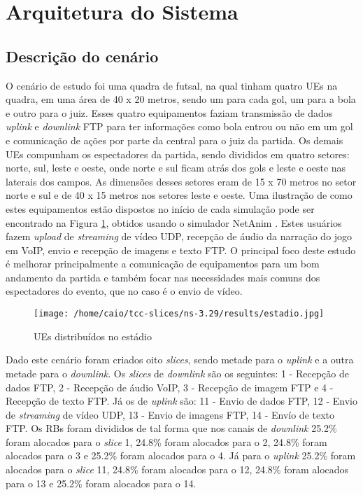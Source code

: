 \documentclass[11pt,twoside]{article}
\begin{document}
\section{Arquitetura do Sistema}

\subsection{Descrição do cenário}

	O cenário de estudo foi uma quadra de futsal, na qual tinham quatro UEs na quadra, em uma área de 40 x 20 metros, sendo um para cada gol, um para a bola e outro para o juiz. Esses quatro equipamentos faziam transmissão de dados \textit{uplink} e \textit{downlink} FTP para ter informações como bola entrou ou não em um gol e comunicação de ações por parte da central para o juiz da partida. Os demais UEs compunham os espectadores da partida, sendo divididos em quatro setores: norte, sul, leste e oeste, onde norte e sul ficam atrás dos gols e leste e oeste nas laterais dos campos. As dimensões desses setores eram de 15 x 70 metros no setor norte e sul e de 40 x 15 metros nos setores leste e oeste. Uma ilustração de como estes equipamentos estão dispostos no início de cada simulação pode ser encontrado na Figura \ref{estadio}, obtidos usando o simulador NetAnim \cite{netAnim}. Estes usuários fazem \textit{upload} de \textit{streaming} de vídeo UDP, recepção de áudio da narração do jogo em VoIP, envio e recepção de imagens e texto FTP. O principal foco deste estudo é melhorar principalmente a comunicação de equipamentos para um bom andamento da partida e também focar nas necessidades mais comuns dos espectadores do evento, que no caso é o envio de vídeo.
	
	\begin{figure}[H]
		\centering
		\texttt{[image: /home/caio/tcc-slices/ns-3.29/results/estadio.jpg]}
		\caption{UEs distribuídos no estádio}
		\label{estadio}
	\end{figure}
	
	Dado este cenário foram criados oito \textit{slices}, sendo metade para o \textit{uplink} e a outra metade para o \textit{downlink}. Os \textit{slices} de  \textit{downlink} são os seguintes: 1 - Recepção de dados FTP, 2 - Recepção de áudio VoIP, 3 - Recepção de imagem FTP e 4 - Recepção de texto FTP. Já os de \textit{uplink} são: 11 - Envio de dados FTP, 12 - Envio de \textit{streaming} de vídeo UDP, 13 - Envio de imagens FTP, 14 - Envío de texto FTP. Os RBs foram divididos de tal forma que nos canais de \textit{downlink} 25.2\% foram alocados para o \textit{slice} 1, 24.8\% foram alocados para o 2, 24.8\% foram alocados para o 3 e 25.2\% foram alocados para o 4. Já para o  \textit{uplink} 25.2\% foram alocados para o \textit{slice} 11, 24.8\% foram alocados para o 12, 24.8\% foram alocados para o 13 e 25.2\% foram alocados para o 14.
	
\end{document}

